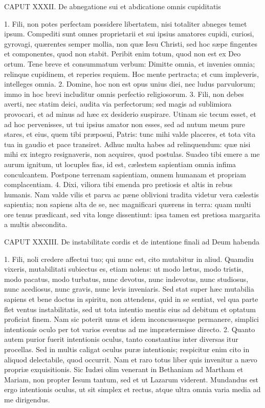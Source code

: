 \documentclass[twoside]{article}
\begin{document}
CAPUT XXXII.
De abnegatione sui et abdicatione omnis cupiditatis

1. Fili, non potes perfectam possidere libertatem, nisi totaliter abneges temet ipsum. Compediti sunt omnes proprietarii et sui ipsius amatores cupidi, curiosi, gyrovagi, quærentes semper mollia, non quæ Iesu Christi, sed hoc sæpe fingentes et componentes, quod non stabit. Peribit enim totum, quod non est ex Deo ortum. Tene breve et consummatum verbum: Dimitte omnia, et invenies omnia; relinque cupidinem, et reperies requiem. Hoc mente pertracta; et cum impleveris, intelleges omnia.
2. Domine, hoc non est opus unius diei, nec ludus parvulorum; immo in hoc brevi includitur omnis perfectio religiosorum.
3. Fili, non debes averti, nec statim deici, audita via perfectorum; sed magis ad sublimiora provocari, et ad minus ad hæc ex desiderio suspirare. Utinam sic tecum esset, et ad hoc pervenisses, ut tui ipsius amator non esses, sed ad nutum meum pure stares, et eius, quem tibi præposui, Patris: tunc mihi valde placeres, et tota vita tua in gaudio et pace transiret. Adhuc multa habes ad relinquendum: quæ nisi mihi ex integro resignaveris, non acquires, quod postulas. Suadeo tibi emere a me aurum ignitum, ut locuples fias, id est, cælestem sapientiam omnia infima conculcantem. Postpone terrenam sapientiam, omnem humanam et propriam complacentiam.
4. Dixi, viliora tibi emenda pro pretiosis et altis in rebus humanis. Nam valde vilis et parva ac pæne oblivioni tradita videtur vera cælestis sapientia; non sapiens alta de se, nec magnificari quærens in terra: quam multi ore tenus prædicant, sed vita longe dissentiunt: ipsa tamen est pretiosa margarita a multis abscondita.


CAPUT XXXIII.
De instabilitate cordis et de intentione finali ad Deum habenda

1. Fili, noli credere affectui tuo; qui nunc est, cito mutabitur in aliud. Quamdiu vixeris, mutabilitati subiectus es, etiam nolens: ut modo lætus, modo tristis, modo pacatus, modo turbatus, nunc devotus, nunc indevotus, nunc studiosus, nunc acediosus, nunc gravis, nunc levis inveniaris. Sed stat super hæc mutabilia sapiens et bene doctus in spiritu, non attendens, quid in se sentiat, vel qua parte flet ventus instabilitatis, sed ut tota intentio mentis eius ad debitum et optatum proficiat finem. Nam sic poterit unus et idem inconcussusque permanere, simplici intentionis oculo per tot varios eventus ad me imprætermisse directo.
2. Quanto autem purior fuerit intentionis oculus, tanto constantius inter diversas itur procellas. Sed in multis caligat oculus puræ intentionis; respicitur enim cito in aliquod delectabile, quod occurrit. Nam et raro totus liber quis invenitur a nævo propriæ exquisitionis. Sic Iudæi olim venerant in Bethaniam ad Martham et Mariam, non propter Iesum tantum, sed et ut Lazarum viderent. Mundandus est ergo intentionis oculus, ut sit simplex et rectus, atque ultra omnia varia media ad me dirigendus.
\end{document}
